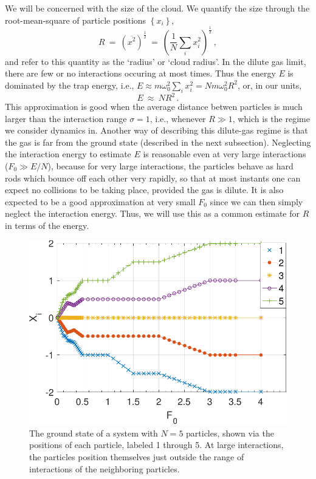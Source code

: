 \documentclass[a4paper, onecolumn]{revtex4-1}
\begin{document}
We will be concerned with the size of the cloud.  We quantify the size through the root-mean-square
of particle positions $\left\lbrace x_i\right\rbrace$, 
\begin{equation}
R ~=~ \left(\overline{x^2}\right)^\frac{1}{2} ~=~ \left(\frac{1}{N}\sum_i{x_i^2}\right)^\frac{1}{2} \, ,
\label{eq:def_of_R}
\end{equation}
and refer to this quantity as the `radius' or `cloud radius'.
%
In the dilute gas limit, there are few or no interactions occuring at most times.  Thus the energy
$E$ is dominated by the trap energy, i.e., $E\approx m\omega_0^2\sum_{i}x_i^2= Nm\omega_0^2R^2$, or,
in our units,
\begin{equation}
  E ~\approx~ NR^2 \, .
  \label{eq:E_and_R}
\end{equation}
%
This approximation is good when the average distance betwen particles is much larger than the
interaction range $\sigma=1$, i.e., whenever $R\gg1$, which is the regime we consider dynamics in.
Another way of describing this dilute-gas regime is that the gas is far from the ground state
(described in the next subsection).  Neglecting the interaction energy to estimate $E$ is reasonable
even at very large interactions ($F_0\gg E/N$), because for very large interactions, the particles
behave as hard rods which bounce off each other very rapidly, so that at most instants one can
expect no collisions to be taking place, provided the gas is dilute.  It is also expected to be a
good approximation at very small $F_0$ since we can then simply neglect the interaction energy.
Thus, we will use this as a common estimate for $R$ in terms of the energy.


\begin{figure}[tbhp]
\centering
\includegraphics[scale=0.65]{N_5_GS_pre_2_rev-crop.pdf}
\caption{The ground state of a system with $N=5$ particles, shown via the positions of each
  particle, labeled 1 through 5.  At large interactions, the particles position themselves just
  outside the range of interactions of the neighboring particles.}
\label{fig:GS1}
\end{figure}
\end{document}
